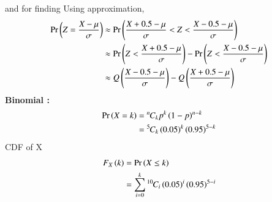 \documentclass[article]{IEEEtran}
\theoremstyle{remark}
\begin{document}
and for finding  Using approximation,
\begin{align}
	\Pr\left(Z=\frac{X-\mu}{\sigma}\right) &\approx \Pr\left(\frac{X+0.5-\mu}{\sigma} < Z < \frac{X-0.5-\mu}{\sigma}\right)\\
	&\approx \Pr\left(Z<\frac{X+0.5-\mu}{\sigma}\right) - \Pr\left(Z<\frac{X-0.5-\mu}{\sigma}\right)\\
	&\approx Q\left(\frac{X-0.5-\mu}{\sigma}\right) - Q\left(\frac{X+0.5-\mu}{\sigma}\right)
\end{align}
\textbf{Binomial :}
\begin{align}
	\Pr\left(X=k\right)&={{}^{n}\mkern-1muC_{k}}p^k\left(1-p\right)^{n-k}\\
	&={{}^{5}\mkern-1muC_{k}}\left(0.05\right)^k\left(0.95\right)^{5-k}
\end{align}
CDF of X
\begin{align}
	F_X\left(k\right)&=\Pr\left(X \leq k\right)\\
	&=\sum_{i=0}^{k}{{}^{10}\mkern-1muC_{i}}\left(0.05\right)^i\left(0.95\right)^{5-i}
\end{align}
\end{document}
